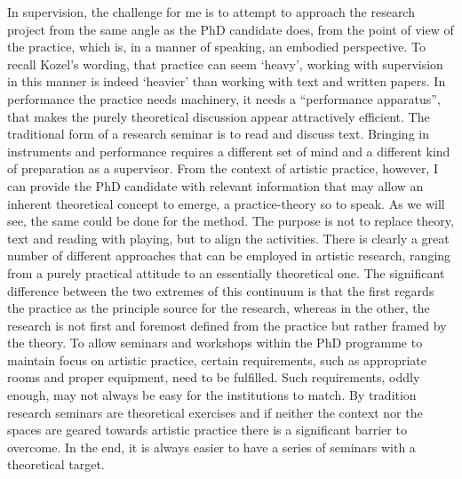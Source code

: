 \documentclass[12pt]{article}
\begin{document}

In supervision, the challenge for me is to attempt to approach the research project from the same angle as the PhD candidate does, from the point of view of the practice, which is, in a manner of speaking, an embodied perspective. To recall Kozel's wording, that practice can seem `heavy', working with supervision in this manner is indeed `heavier' than working with text and written papers. In performance the practice needs machinery, it needs a ``performance apparatus'', that makes the purely theoretical discussion appear attractively efficient. The traditional form of a research seminar is to read and discuss text. Bringing in instruments and performance requires a different set of mind and a different kind of preparation as a supervisor. From the context of artistic practice, however, I can provide the PhD candidate with relevant information that may allow an inherent theoretical concept to emerge, a practice-theory so to speak. As we will see, the same could be done for the method. The purpose is not to replace theory, text and reading with playing, but to align the activities. There is clearly a great number of different approaches that can be employed in artistic research, ranging from a purely practical attitude to an essentially theoretical one. The significant difference between the two extremes of this continuum is that the first regards the practice as the principle source for the research, whereas in the other, the research is not first and foremost defined from the practice but rather framed by the theory. To allow seminars and workshops within the PhD programme to maintain focus on artistic practice, certain requirements, such as appropriate rooms and proper equipment, need to be fulfilled. Such requirements, oddly enough, may not always be easy for the institutions to match. By tradition research seminars are theoretical exercises and if neither the context nor the spaces are geared towards artistic practice there is a significant barrier to overcome. In the end, it is always easier to have a series of seminars with a theoretical target.
\end{document}
